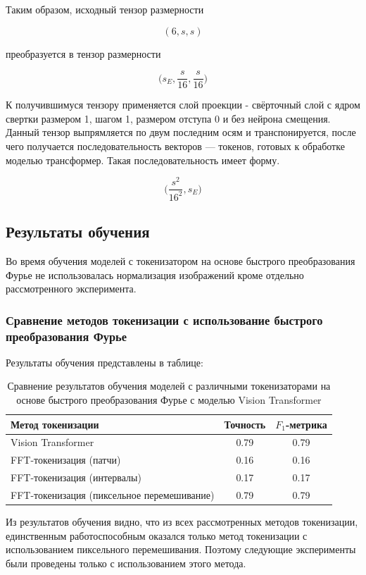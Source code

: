 \documentclass[times,specification,annotation]{itmo-student-thesis}
\begin{document}
Таким образом, исходный тензор размерности

$$
(6, s, s)
$$

преобразуется в тензор размерности

$$
\Big(s_E, \dfrac{s}{16}, \dfrac{s}{16}\Big)
$$

К получившимуся тензору применяется слой проекции - свёрточный слой с ядром свертки размером 1, шагом 1, размером отступа 0 и без нейрона смещения. Данный тензор выпрямляется по двум последним осям и транспонируется, после чего получается последовательность векторов --- токенов, готовых к обработке моделью трансформер. Такая последовательность имеет форму.

$$
\Big(\dfrac{s^2}{16^2}, s_E\Big)
$$

\subsection{Результаты обучения}

Во время обучения моделей с токенизатором на основе быстрого преобразования Фурье не использовалась нормализация изображений кроме отдельно рассмотренного эксперимента.

\subsubsection{Сравнение методов токенизации с использование быстрого преобразования Фурье}

Результаты обучения представлены в таблице:

\begin{table}[H]
  \centering
  \caption{Сравнение результатов обучения моделей с различными токенизаторами на основе быстрого преобразования Фурье с моделью Vision Transformer}
  \label{tab:fft-tokenization}
  \begin{tabular}{|l|c|c|}
    \hline
    Метод токенизации & Точность & $F_1$-метрика \\ \hline
    Vision Transformer & 0.79 & 0.79  \\
    FFT-токенизация (патчи) & 0.16 & 0.16  \\ 
    FFT-токенизация (интервалы)  & 0.17 & 0.17  \\ 
    FFT-токенизация (пиксельное перемешивание) & 0.79 & 0.79 \\
    \hline
  \end{tabular}
\end{table}

Из результатов обучения видно, что из всех рассмотренных методов токенизации, единственным работоспособным оказался только метод токенизации с использованием пиксельного перемешивания. Поэтому следующие эксперименты были проведены только с использованием этого метода.
\end{document}
